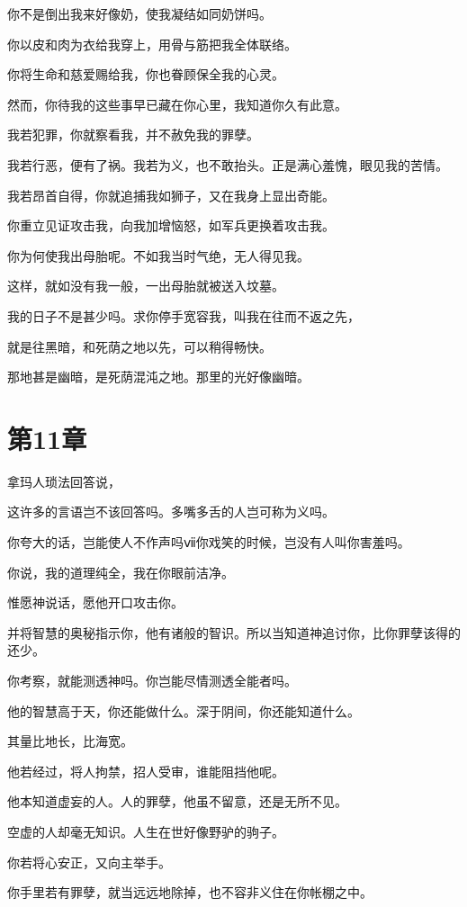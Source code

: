 \documentclass[12pt,oneside]{book}
\begin{document}
你不是倒出我来好像奶，使我凝结如同奶饼吗。

你以皮和肉为衣给我穿上，用骨与筋把我全体联络。

你将生命和慈爱赐给我，你也眷顾保全我的心灵。

然而，你待我的这些事早已藏在你心里，我知道你久有此意。

我若犯罪，你就察看我，并不赦免我的罪孽。

我若行恶，便有了祸。我若为义，也不敢抬头。正是满心羞愧，眼见我的苦情。

我若昂首自得，你就追捕我如狮子，又在我身上显出奇能。

你重立见证攻击我，向我加增恼怒，如军兵更换着攻击我。

你为何使我出母胎呢。不如我当时气绝，无人得见我。

这样，就如没有我一般，一出母胎就被送入坟墓。

我的日子不是甚少吗。求你停手宽容我，叫我在往而不返之先，

就是往黑暗，和死荫之地以先，可以稍得畅快。

那地甚是幽暗，是死荫混沌之地。那里的光好像幽暗。



\chapter{第11章}
拿玛人琐法回答说，

这许多的言语岂不该回答吗。多嘴多舌的人岂可称为义吗。

你夸大的话，岂能使人不作声吗ⅶ你戏笑的时候，岂没有人叫你害羞吗。

你说，我的道理纯全，我在你眼前洁净。

惟愿神说话，愿他开口攻击你。

并将智慧的奥秘指示你，他有诸般的智识。所以当知道神追讨你，比你罪孽该得的还少。

你考察，就能测透神吗。你岂能尽情测透全能者吗。

他的智慧高于天，你还能做什么。深于阴间，你还能知道什么。

其量比地长，比海宽。

他若经过，将人拘禁，招人受审，谁能阻挡他呢。

他本知道虚妄的人。人的罪孽，他虽不留意，还是无所不见。

空虚的人却毫无知识。人生在世好像野驴的驹子。

你若将心安正，又向主举手。

你手里若有罪孽，就当远远地除掉，也不容非义住在你帐棚之中。
\end{document}
